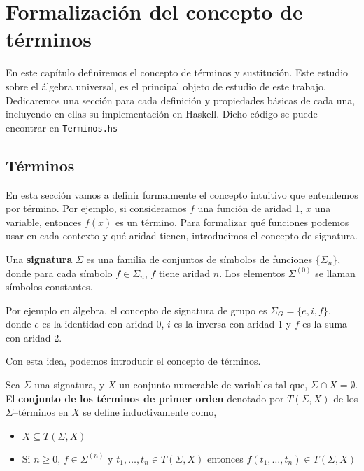 \chapter{Formalización del concepto de términos}

En este capítulo definiremos el concepto de términos y
sustitución. Este estudio sobre el álgebra universal, es el principal
objeto de estudio de este trabajo. Dedicaremos una sección para cada
definición y propiedades básicas de cada una, incluyendo en ellas su
implementación en Haskell. Dicho código se puede encontrar en
\texttt{Terminos.hs}

\section{Términos}

En esta sección vamos a definir formalmente el concepto intuitivo que
entendemos por término. Por ejemplo, si consideramos $f$ una función de aridad
1, $x$ una variable, entonces $f(x)$ es un término. Para formalizar qué
funciones podemos usar en cada contexto y qué aridad tienen, introducimos el
concepto de signatura.

\begin{defi} 
  Una \textbf{signatura} $\Sigma$ es una familia de conjuntos de símbolos de
  funciones $\{ \Sigma_n \}$, donde para cada símbolo
  $f \in \Sigma_n$, $f$ tiene aridad $n$. Los elementos $\Sigma^{(0)}$
  se llaman símbolos constantes.
\end{defi}

Por ejemplo en álgebra, el concepto de signatura de grupo
es $\Sigma_G = \{e,i,f\}$, donde $e$ es la identidad con aridad 0,
$i$ es la inversa con aridad 1 y $f$ es la suma con aridad 2.

Con esta idea, podemos introducir el concepto de términos.

\begin{defi}
  Sea $\Sigma$ una signatura, y $X$ un conjunto numerable de variables
  tal que, $\Sigma \cap X = \emptyset$. El \textbf{conjunto de los términos de
  primer orden} denotado por $T(\Sigma,X)$ de los $\Sigma$--términos en
  $X$ se define inductivamente como,
  \begin{itemize}
  \item $X \subseteq T(\Sigma,X)$
  \item Si $n \geq 0$, $f \in \Sigma^{(n)}$ y $t_1, \dots, t_n \in
    T(\Sigma, X)$ entonces $f(t_1, \dots, t_n) \in T(\Sigma,X)$ 
  \end{itemize}
\end{defi}

